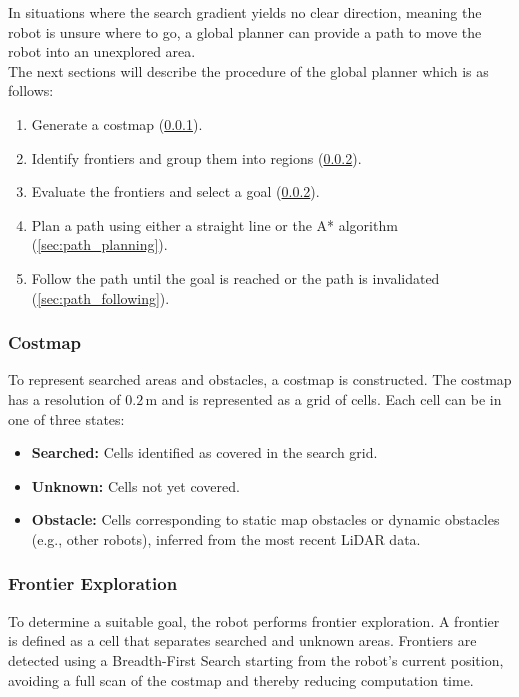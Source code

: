 In situations where the search gradient yields no clear direction, meaning the robot is unsure where to go, a global planner can provide a path to move the robot into an unexplored area. \\


The next sections will describe the procedure of the global planner which is as follows:

\begin{enumerate}
  \item Generate a costmap (\cref{sec:costmap}).
  \item Identify frontiers and group them into regions (\cref{sec:frontier_exploration}).
  \item Evaluate the frontiers and select a goal (\cref{sec:frontier_exploration}).
  \item Plan a path using either a straight line or the A* algorithm (\cref{sec:path_planning}).
  \item Follow the path until the goal is reached or the path is invalidated (\cref{sec:path_following}).
\end{enumerate}

\subsubsection{Costmap}\label{sec:costmap}
To represent searched areas and obstacles, a costmap is constructed. 
The costmap has a resolution of $0.2\,\text{m}$ and is represented as a grid of cells. Each cell can be in one of three states:
\begin{itemize}
  \item \textbf{Searched:} Cells identified as covered in the search grid.
  \item \textbf{Unknown:} Cells not yet covered.
  \item \textbf{Obstacle:} Cells corresponding to static map obstacles or dynamic obstacles (e.g., other robots), inferred from the most recent LiDAR data.
\end{itemize}

\subsubsection{Frontier Exploration}\label{sec:frontier_exploration}
To determine a suitable goal, the robot performs frontier exploration.
A frontier is defined as a cell that separates searched and unknown areas.
Frontiers are detected using a Breadth-First Search starting from the robot’s current position, avoiding a full scan of the costmap and thereby reducing computation time.

